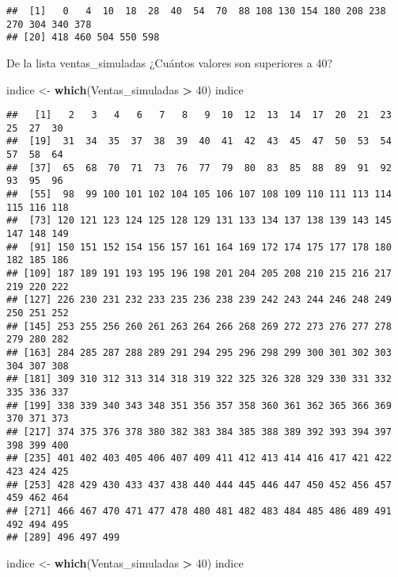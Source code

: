 \documentclass[
]{article}
\newenvironment{Shaded}{\begin{snugshade}}{\end{snugshade}}
\newcommand{\DecValTok}[1]{\textcolor[rgb]{0.00,0.00,0.81}{#1}}
\newcommand{\FunctionTok}[1]{\textcolor[rgb]{0.13,0.29,0.53}{\textbf{#1}}}
\newcommand{\NormalTok}[1]{#1}
\newcommand{\OtherTok}[1]{\textcolor[rgb]{0.56,0.35,0.01}{#1}}
\newcommand{\SpecialCharTok}[1]{\textcolor[rgb]{0.81,0.36,0.00}{\textbf{#1}}}
\begin{document}
\begin{verbatim}
##  [1]   0   4  10  18  28  40  54  70  88 108 130 154 180 208 238 270 304 340 378
## [20] 418 460 504 550 598
\end{verbatim}

De la lista ventas\_simuladas ¿Cuántos valores son superiores a 40?

\begin{Shaded}
\begin{Highlighting}[]
\NormalTok{indice }\OtherTok{\textless{}{-}} \FunctionTok{which}\NormalTok{(Ventas\_simuladas }\SpecialCharTok{\textgreater{}} \DecValTok{40}\NormalTok{)}
\NormalTok{indice}
\end{Highlighting}
\end{Shaded}

\begin{verbatim}
##   [1]   2   3   4   6   7   8   9  10  12  13  14  17  20  21  23  25  27  30
##  [19]  31  34  35  37  38  39  40  41  42  43  45  47  50  53  54  57  58  64
##  [37]  65  68  70  71  73  76  77  79  80  83  85  88  89  91  92  93  95  96
##  [55]  98  99 100 101 102 104 105 106 107 108 109 110 111 113 114 115 116 118
##  [73] 120 121 123 124 125 128 129 131 133 134 137 138 139 143 145 147 148 149
##  [91] 150 151 152 154 156 157 161 164 169 172 174 175 177 178 180 182 185 186
## [109] 187 189 191 193 195 196 198 201 204 205 208 210 215 216 217 219 220 222
## [127] 226 230 231 232 233 235 236 238 239 242 243 244 246 248 249 250 251 252
## [145] 253 255 256 260 261 263 264 266 268 269 272 273 276 277 278 279 280 282
## [163] 284 285 287 288 289 291 294 295 296 298 299 300 301 302 303 304 307 308
## [181] 309 310 312 313 314 318 319 322 325 326 328 329 330 331 332 335 336 337
## [199] 338 339 340 343 348 351 356 357 358 360 361 362 365 366 369 370 371 373
## [217] 374 375 376 378 380 382 383 384 385 388 389 392 393 394 397 398 399 400
## [235] 401 402 403 405 406 407 409 411 412 413 414 416 417 421 422 423 424 425
## [253] 428 429 430 433 437 438 440 444 445 446 447 450 452 456 457 459 462 464
## [271] 466 467 470 471 477 478 480 481 482 483 484 485 486 489 491 492 494 495
## [289] 496 497 499
\end{verbatim}

\begin{Shaded}
\begin{Highlighting}[]
\NormalTok{indice }\OtherTok{\textless{}{-}}  \FunctionTok{which}\NormalTok{(Ventas\_simuladas }\SpecialCharTok{\textgreater{}} \DecValTok{40}\NormalTok{)}
\NormalTok{indice}
\end{Highlighting}
\end{Shaded}
\end{document}
